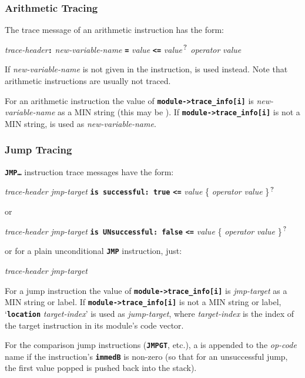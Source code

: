 \documentclass[12pt]{article}
\newcommand{\TT}[1]{{\tt \bfseries #1}}
\newcommand{\QMARK}{{$^{\,\mbox{\footnotesize ?}}$}}
\newcommand{\EOL}{\penalty \exhyphenpenalty}
\begin{document}
\subsubsection{Arithmetic Tracing}
\label{ARITHMETIC-TRACING}

The trace message of an arithmetic instruction has the form:
\begin{center}
{\em trace-header}\TT{:} {\em new-variable-name} \TT{=} {\em value}
                    \TT{<=} {\em value}\QMARK{}
                    {\em operator} {\em value}
\end{center}
If {\em new-variable-name} is not given in the instruction,
\TT{*} is used instead.
Note that arithmetic instructions are usually not traced.

For an arithmetic instruction the value of
\TT{module->\EOL trace\_\EOL info[i]} is {\em new-variable-name}
as a MIN string (this may be \TT{*}).
If \TT{module->\EOL trace\_\EOL info[i]} is not a MIN string,
\TT{*} is used as {\em new-variable-name}.

\subsubsection{Jump Tracing}
\label{JUMP-TRACING}

\TT{JMP\ldots} instruction trace messages have the form:

\begin{center}
{\em trace-header} {\em jmp-target} \TT{is successful:~true}
                    \TT{<=} {\em value} \{ {\em operator} {\em value} \}\QMARK{}
\end{center}
or
\begin{center}
{\em trace-header} {\em jmp-target} \TT{is UNsuccessful:~false}
                    \TT{<=} {\em value} \{ {\em operator} {\em value} \}\QMARK{}
\end{center}

or for a plain unconditional \TT{JMP} instruction, just:
\begin{center}
{\em trace-header} {\em jmp-target}
\end{center}

For a jump instruction the value of
\TT{module->\EOL trace\_\EOL info[i]} is {\em jmp-target}
as a MIN string or label.
If \TT{module->\EOL trace\_\EOL info[i]} is not a MIN string or label,
`\TT{location} {\em target-index}' is used as {\em jump-target}, where
{\em target-index} is the index of the target instruction in its
module's code vector.

For the comparison jump instructions (\TT{JMPGT}, etc.), a \TT{*}
is appended to the {\em op-code} name if the instruction's
\TT{immedB} is non-zero (so that for an unsuccessful jump,
the first value popped is
pushed back into the stack).
\end{document}
